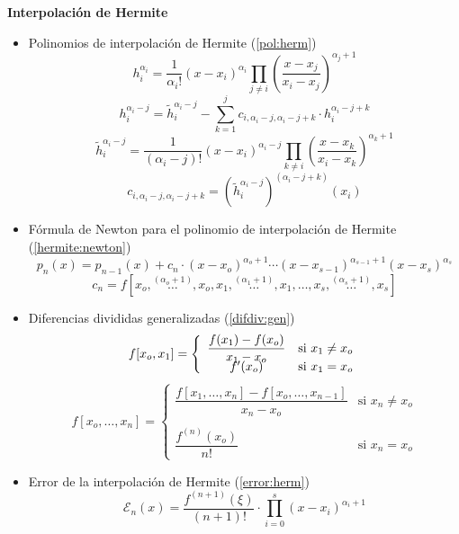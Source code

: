 \textbf{Interpolación de Hermite}
\begin{itemize}
    \item Polinomios de interpolación de Hermite (\ref{pol:herm})
    $$h_i^{\alpha_i}=\frac{1}{\alpha_i!}(x-x_i)^{\alpha_i}\prod_{j\neq i}\left(\frac{x-x_j}{x_i-x_j}\right)^{\alpha_j+1}$$
        $$h_i^{\alpha_i-j}=\tilde{h}_i^{\alpha_i-j}-\sum_{k=1}^jc_{i,\alpha_i-j,\alpha_i-j+k}\cdot h_i^{\alpha_i-j+k}$$
        $$\tilde{h}_i^{\alpha_i-j}=\frac{1}{(\alpha_i-j)!}(x-x_i)^{\alpha_i-j}\prod_{k\neq i}\left(\frac{x-x_k}{x_i-x_k}\right)^{\alpha_k+1}$$
        $$c_{i,\alpha_i-j,\alpha_i-j+k}=(\tilde{h}_i^{\alpha_i-j})^{(\alpha_i-j+k)}(x_i)$$
    \item Fórmula de Newton para el polinomio de interpolación de Hermite (\ref{hermite:newton})
$$p_n(x)=p_{n-1}(x)+c_n\cdot (x-x_o)^{\alpha_o+1}\cdots (x-x_{s-1})^{\alpha_{s-1}+1}(x-x_s)^{\alpha_s}$$
$$c_n=f[x_o,\overset{(\alpha_o+1)}{\ldots},x_o,x_1,\overset{(\alpha_1+1)}{\ldots},x_1,\ldots,x_s,\overset{(\alpha_s+1)}{\ldots},x_s]$$
    \item Diferencias divididas generalizadas (\ref{difdiv:gen})
    $$f[x_o,x_1]=\left\{\begin{array}{cc}
       \dfrac{f(x_1)-f(x_o)}{x_1-x_o}  &\text{si }x_1\neq x_o  \\
       \vspace{-5mm} & \\
         f'(x_o) & \text{si }x_1= x_o
    \end{array}\right.$$
    $$f[x_o,\ldots,x_n]=\left\{\begin{array}{cc}
       \dfrac{f[x_1,\ldots,x_n]-f[x_o,\ldots,x_{n-1}]}{x_n-x_o}  &\text{si }x_n\neq x_o  \\
       & \\
         \dfrac{f^{(n)}(x_o)}{n!} & \text{si }x_n= x_o
    \end{array}\right.$$
    \item Error de la interpolación de Hermite (\ref{error:herm})
    $$\mathcal{E}_n(x)=\dfrac{f^{(n+1)}(\xi)}{(n+1)!}\cdot \prod_{i=0}^s(x-x_i)^{\alpha_i+1}$$
\end{itemize}
